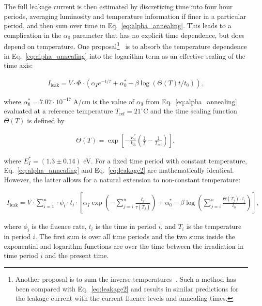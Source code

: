 The full leakage current is then estimated by discretizing time into four hour periods, averaging luminosity and temperature information if finer in a particular period, and then sum over time in Eq.~\ref{eq:alpha_annealing}.  This leads to a complication in the $\alpha_0$ parameter that has no explicit time dependence, but does depend on temperature.  One proposal\footnote{Another proposal is to sum the inverse temperatures~\cite{Barney:1709387}.  Such a method has been compared with Eq.~\ref{eq:leakage2} and results in similar predictions for the leakage current with the current fluence levels and annealing times.}~\cite{moll-thesis} is to absorb the temperature dependence in Eq.~\ref{eq:alpha_annealing} into the logarithm term as an effective scaling of the time axis:

\begin{align}
\label{eq:leakage2}
I_\text{leak}=V\cdot\Phi\cdot\left(\alpha_Ie^{-t/\tau}+\alpha_0^*-\beta\log(\Theta(T)t/t_0)\right),
\end{align}

\noindent where $\alpha_0^*=7.07\cdot 10^{-17}\;$A/cm is the value of $\alpha_0$ from Eq.~\ref{eq:alpha_annealing} evaluated at a reference temperature $T_\text{ref}=21^{\circ}$C and the time scaling function $\Theta(T)$ is defined by

\begin{align}
\label{eq:tempscaling}
\Theta(T) = \exp \left[ - \frac{E_I^*}{k_\text{B} } \left( \frac{1}{T} - \frac{1}{T_\text{ref} } \right) \right],
\end{align}

where $E_I^*=(1.3\pm 0.14)$ eV.  For a fixed time period with constant temperature, Eq.~\ref{eq:alpha_annealing} and Eq.~\ref{eq:leakage2} are mathematically identical.  However, the latter allows for a natural extension to non-constant temperature:

\begin{align}
\label{eq:leakage_modified}
I_\text{leak}=V\cdot\sum_{i=1}^n\cdot\phi_i\cdot t_i\cdot\left[\alpha_I\exp\left(-\sum_{j=i}^n\frac{t_j}{\tau(T_j)}\right)+\alpha_0^*-\beta\log\left(\sum_{j=i}^n\frac{\Theta(T_j)\cdot t_j }{ t_0}\right)\right],
\end{align}

where $\phi_i$ is the fluence rate, $t_i$ is the time in period $i$, and $T_i$ is the temperature in period $i$.  The first sum is over all time periods and the two sums inside the exponential and logarithm functions are over the time between the irradiation in time period $i$ and the present time.

